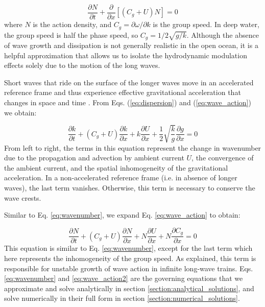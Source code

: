 \documentclass[lineno]{jfm}
\begin{document}
\begin{equation}
\label{eq:wave_action}
\dfrac{\partial N}{\partial t}
+ \dfrac{\partial}{\partial x} \left[\left(C_g + U\right)N\right]
= 0
\end{equation}
where $N$ is the action density, and $C_g = \partial \omega / \partial k$ is the
group speed.
In deep water, the group speed is half the phase speed, so $C_g = 1/2\sqrt{g/k}$.
Although the absence of wave growth and dissipation is not generally realistic
in the open ocean, it is a helpful approximation that allows us to isolate the
hydrodynamic modulation effects solely due to the motion of the long waves.

Short waves that ride on the surface of the longer waves move in an accelerated
reference frame and thus experience effective gravitational acceleration that
changes in space and time \citep{phillips1981dispersion,longuet1986eulerian,longuet1987propagation}.
From Eqs. (\ref{eq:dispersion}) and (\ref{eq:wave_action}) we obtain:

\begin{equation}
\label{eq:wavenumber}
\dfrac{\partial k}{\partial t}
+ \left(C_g + U\right) \dfrac{\partial k}{\partial x}
+ k \dfrac{\partial U}{\partial x}
+ \dfrac{1}{2} \sqrt{\dfrac{k}{g}} \dfrac{\partial g}{\partial x}
= 0
\end{equation}
From left to right, the terms in this equation represent the change in wavenumber
due to the propagation and advection by ambient current $U$, the convergence of
the ambient current, and the spatial inhomogeneity of the gravitational acceleration.
In a non-accelerated reference frame (i.e. in absence of longer waves), the last
term vanishes.
Otherwise, this term is necessary to conserve the wave crests.

Similar to Eq. \ref{eq:wavenumber}, we expand Eq. \ref{eq:wave_action} to obtain:

\begin{equation}
\label{eq:wave_action2}
\dfrac{\partial N}{\partial t}
+ \left(C_g + U\right) \dfrac{\partial N}{\partial x}
+ N \dfrac{\partial U}{\partial x}
+ N \dfrac{\partial C_g}{\partial x}
= 0
\end{equation}
This equation is similar to Eq. \ref{eq:wavenumber}, except for the last term
which here represents the inhomogeneity of the group speed.
As \citet{peureux2021unsteady} explained, this term is responsible for unstable
growth of wave action in infinite long-wave trains.
Eqs. \ref{eq:wavenumber} and \ref{eq:wave_action2} are the governing equations
that we approximate and solve analytically in section \ref{section:analytical_solutions},
and solve numerically in their full form in section \ref{section:numerical_solutions}.
\end{document}
